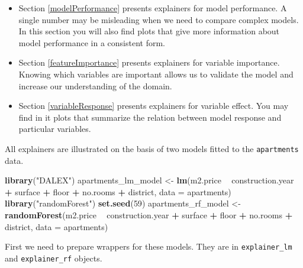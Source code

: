 \documentclass[]{book}
\newenvironment{Shaded}{\begin{snugshade}}{\end{snugshade}}
\newcommand{\DataTypeTok}[1]{\textcolor[rgb]{0.13,0.29,0.53}{#1}}
\newcommand{\DecValTok}[1]{\textcolor[rgb]{0.00,0.00,0.81}{#1}}
\newcommand{\KeywordTok}[1]{\textcolor[rgb]{0.13,0.29,0.53}{\textbf{#1}}}
\newcommand{\NormalTok}[1]{#1}
\newcommand{\OperatorTok}[1]{\textcolor[rgb]{0.81,0.36,0.00}{\textbf{#1}}}
\newcommand{\StringTok}[1]{\textcolor[rgb]{0.31,0.60,0.02}{#1}}
\providecommand{\tightlist}{%
  \setlength{\itemsep}{0pt}\setlength{\parskip}{0pt}}
\theoremstyle{definition}
\theoremstyle{definition}
\theoremstyle{definition}
\theoremstyle{remark}
\begin{document}
\begin{itemize}
\tightlist
\item
  Section \ref{modelPerformance} presents explainers for model
  performance. A single number may be misleading when we need to compare
  complex models. In this section you will also find plots that give
  more information about model performance in a consistent form.
\item
  Section \ref{featureImportance} presents explainers for variable
  importance. Knowing which variables are important allows us to
  validate the model and increase our understanding of the domain.
\item
  Section \ref{variableResponse} presents explainers for variable
  effect. You may find in it plots that summarize the relation between
  model response and particular variables.
\end{itemize}

All explainers are illustrated on the basis of two models fitted to the
\texttt{apartments} data.

\begin{Shaded}
\begin{Highlighting}[]
\KeywordTok{library}\NormalTok{(}\StringTok{"DALEX"}\NormalTok{)}
\NormalTok{apartments_lm_model <-}\StringTok{ }\KeywordTok{lm}\NormalTok{(m2.price }\OperatorTok{~}\StringTok{ }\NormalTok{construction.year }\OperatorTok{+}\StringTok{ }\NormalTok{surface }\OperatorTok{+}\StringTok{ }\NormalTok{floor }\OperatorTok{+}\StringTok{ }
\StringTok{                      }\NormalTok{no.rooms }\OperatorTok{+}\StringTok{ }\NormalTok{district, }\DataTypeTok{data =}\NormalTok{ apartments)}
\KeywordTok{library}\NormalTok{(}\StringTok{"randomForest"}\NormalTok{)}
\KeywordTok{set.seed}\NormalTok{(}\DecValTok{59}\NormalTok{)}
\NormalTok{apartments_rf_model <-}\StringTok{ }\KeywordTok{randomForest}\NormalTok{(m2.price }\OperatorTok{~}\StringTok{ }\NormalTok{construction.year }\OperatorTok{+}\StringTok{ }\NormalTok{surface }\OperatorTok{+}\StringTok{ }\NormalTok{floor }\OperatorTok{+}\StringTok{ }
\StringTok{                      }\NormalTok{no.rooms }\OperatorTok{+}\StringTok{ }\NormalTok{district, }\DataTypeTok{data =}\NormalTok{ apartments)}
\end{Highlighting}
\end{Shaded}

First we need to prepare wrappers for these models. They are in
\texttt{explainer\_lm} and \texttt{explainer\_rf} objects.
\end{document}
